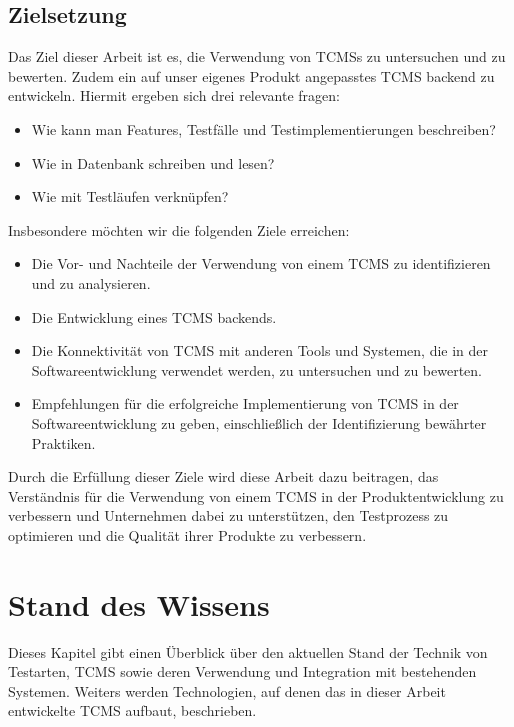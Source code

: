 \documentclass[a4paper, fontsize=11pt, parskip=half, twoside]{scrreprt}
\begin{document}
	\section{Zielsetzung}
	Das Ziel dieser Arbeit ist es, die Verwendung von \acp{TCMS} zu untersuchen und zu bewerten. 
	Zudem ein auf unser eigenes Produkt angepasstes \ac{TCMS} backend zu entwickeln. 
	Hiermit ergeben sich drei relevante fragen:
	
	\begin{itemize}
		\item Wie kann man Features, Testfälle und Testimplementierungen beschreiben? 
		\item Wie in Datenbank schreiben und lesen? 
		\item Wie mit Testläufen verknüpfen?
	\end{itemize}
	
	Insbesondere möchten wir die folgenden Ziele erreichen:
	
	\begin{itemize}
		\item Die Vor- und Nachteile der Verwendung von einem \ac{TCMS} zu identifizieren und zu analysieren.
		\item Die Entwicklung eines \ac{TCMS} backends.
		\item Die Konnektivität von \ac{TCMS} mit anderen Tools und Systemen, die in der Softwareentwicklung verwendet werden, zu untersuchen und zu bewerten.
		\item Empfehlungen für die erfolgreiche Implementierung von \ac{TCMS} in der Softwareentwicklung zu geben, einschließlich der Identifizierung bewährter Praktiken.
	\end{itemize}
	
	Durch die Erfüllung dieser Ziele wird diese Arbeit dazu beitragen, das Verständnis für die Verwendung von einem \ac{TCMS} in der Produktentwicklung zu verbessern und Unternehmen dabei zu unterstützen, den Testprozess zu optimieren und die Qualität ihrer Produkte zu verbessern.
	
	
	
	\chapter{Stand des Wissens}
	Dieses Kapitel gibt einen Überblick über den aktuellen Stand der Technik von Testarten, \ac{TCMS} sowie deren Verwendung und Integration mit bestehenden Systemen. 
	Weiters werden Technologien, auf denen das in dieser Arbeit entwickelte \ac{TCMS} aufbaut, beschrieben.
	
\end{document}
